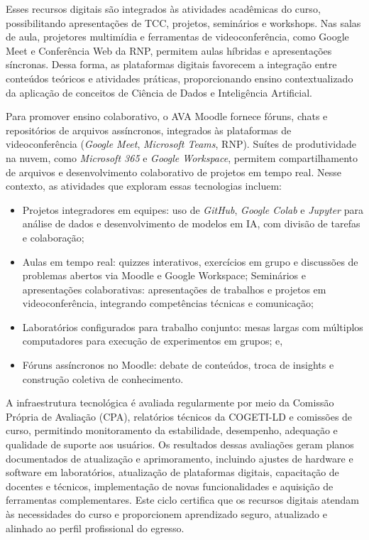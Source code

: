 Esses recursos digitais são integrados às atividades acadêmicas do curso, possibilitando apresentações de TCC, projetos, seminários e workshops. Nas salas de aula, projetores multimídia e ferramentas de videoconferência, como Google Meet e Conferência Web da RNP, permitem aulas híbridas e apresentações síncronas. Dessa forma, as plataformas digitais favorecem a integração entre conteúdos teóricos e atividades práticas, proporcionando ensino contextualizado da aplicação de conceitos de Ciência de Dados e Inteligência Artificial.

Para promover ensino colaborativo, o AVA Moodle fornece fóruns, chats e repositórios de arquivos assíncronos, integrados às plataformas de videoconferência (\textit{Google Meet}, \textit{Microsoft Teams}, RNP). Suítes de produtividade na nuvem, como \textit{Microsoft 365} e \textit{Google Workspace}, permitem compartilhamento de arquivos e desenvolvimento colaborativo de projetos em tempo real. Nesse contexto, as atividades que exploram essas tecnologias incluem:
\begin{itemize}
    \item Projetos integradores em equipes: uso de \textit{GitHub}, \textit{Google Colab} e \textit{Jupyter} para análise de dados e desenvolvimento de modelos em IA, com divisão de tarefas e colaboração;
    \item Aulas em tempo real: quizzes interativos, exercícios em grupo e discussões de problemas abertos via Moodle e Google Workspace;
Seminários e apresentações colaborativas: apresentações de trabalhos e projetos em videoconferência, integrando competências técnicas e comunicação;
    \item Laboratórios configurados para trabalho conjunto: mesas largas com múltiplos computadores para execução de experimentos em grupos; e,
    \item Fóruns assíncronos no Moodle: debate de conteúdos, troca de insights e construção coletiva de conhecimento.
\end{itemize}

A infraestrutura tecnológica é avaliada regularmente por meio da Comissão Própria de Avaliação (CPA), relatórios técnicos da COGETI-LD e comissões de curso, permitindo monitoramento da estabilidade, desempenho, adequação e qualidade de suporte aos usuários. Os resultados dessas avaliações geram planos documentados de atualização e aprimoramento, incluindo ajustes de hardware e software em laboratórios, atualização de plataformas digitais, capacitação de docentes e técnicos, implementação de novas funcionalidades e aquisição de ferramentas complementares. Este ciclo certifica que os recursos digitais atendam às necessidades do curso e proporcionem aprendizado seguro, atualizado e alinhado ao perfil profissional do egresso.

